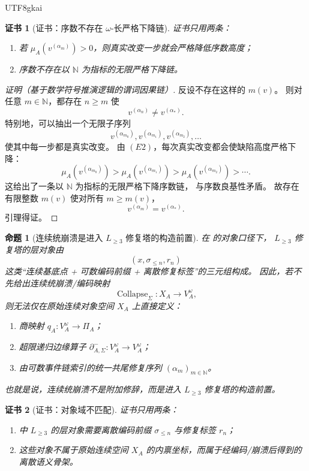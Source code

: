 \documentclass[12pt]{article}
\newtheorem{proposition}{命题}[section]
\newtheorem{Certificate}{证书}[section]
\newcommand{\NN}{\mathbb{N}}
\newcommand{\Collapse}{\operatorname{Collapse}}
\begin{document}
\begin{CJK*}{UTF8}{gkai}
\begin{Certificate}[证书：序数不存在 \(\omega\)-长严格下降链]
\label{cert:tex1-ch10-finite-change}
证书只用两条：
\begin{enumerate}
  \item 若 \(\mu_A(v^{(\alpha_m)})>0\)，则真实改变一步就会严格降低序数高度；
  \item 序数不存在以 \(\NN\) 为指标的无限严格下降链。
\end{enumerate}
\end{Certificate}

\begin{proof}[证明（基于数学符号推演逻辑的谓词因果链）]
反设不存在这样的 \(m(v)\)。
则对任意 \(m\in\NN\)，都存在 \(n\ge m\) 使
\[
  v^{(\alpha_n)}\neq v^{(\alpha_\ast)}.
\]
特别地，可以抽出一个无限子序列
\[
  v^{(\alpha_{m_0})},v^{(\alpha_{m_1})},v^{(\alpha_{m_2})},\dots
\]
使其中每一步都是真实改变。
由 \((E2)\)，每次真实改变都会使缺陷高度严格下降：
\[
  \mu_A(v^{(\alpha_{m_0})})
  >
  \mu_A(v^{(\alpha_{m_1})})
  >
  \mu_A(v^{(\alpha_{m_2})})
  >
  \cdots.
\]
这给出了一条以 \(\NN\) 为指标的无限严格下降序数链，
与序数良基性矛盾。
故存在有限整数 \(m(v)\) 使对所有 \(m\ge m(v)\)，
\[
  v^{(\alpha_m)}=v^{(\alpha_\ast)}.
\]
引理得证。
\end{proof}

\begin{proposition}[连续统崩溃是进入 \(L_{\ge 3}\) 修复塔的构造前置]
\label{prop:tex1-ch10-prior}
在 \cite{RepoTex41HomotopyRepairBundle} 的对象口径下，
\(L_{\ge 3}\) 修复塔的层对象由
\[
  (x,\sigma_{\le n},r_n)
\]
这类“连续基底点 + 可数编码前缀 + 离散修复标签”的三元组构成。
因此，若不先给出连续统崩溃/编码映射
\[
  \Collapse_{\Sigma}:X_A\to V_A^\omega,
\]
则无法仅在原始连续对象空间 \(X_A\) 上直接定义：
\begin{enumerate}
  \item 商映射 \(q_A:V_A^\omega\to\Pi_A\)；
  \item 超限递归边缘算子 \(\partial^-_{A,\Sigma}:V_A^\omega\to V_A^\omega\)；
  \item 由可数事件链索引的统一共尾修复序列 \((\alpha_m)_{m\in\NN}\)。
\end{enumerate}
也就是说，连续统崩溃不是附加修辞，而是进入 \(L_{\ge 3}\) 修复塔的构造前置。
\end{proposition}

\begin{Certificate}[证书：对象域不匹配]
\label{cert:tex1-ch10-prior}
证书只用两条：
\begin{enumerate}
  \item \cite{RepoTex41HomotopyRepairBundle} 中 \(L_{\ge 3}\) 的层对象需要离散编码前缀 \(\sigma_{\le n}\) 与修复标签 \(r_n\)；
  \item 这些对象不属于原始连续空间 \(X_A\) 的内禀坐标，而属于经编码/崩溃后得到的离散语义骨架。
\end{enumerate}
\end{Certificate}


\end{CJK*}
\end{document}

